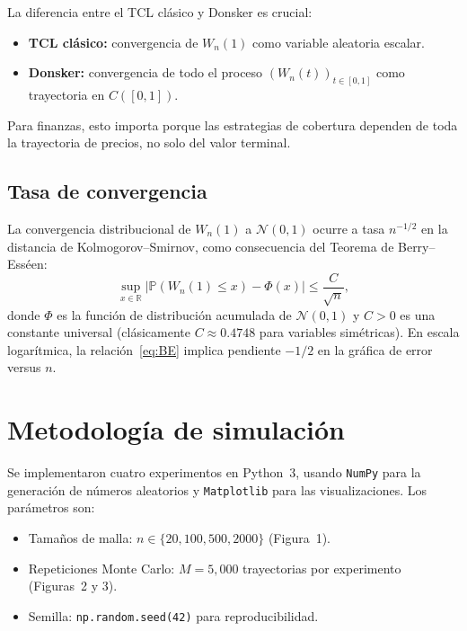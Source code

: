 \documentclass[12pt, a4paper]{article}
\newcommand{\Prob}{\mathbb{P}}
\newcommand{\R}{\mathbb{R}}
\begin{document}
La diferencia entre el TCL clásico y Donsker es crucial:
\begin{itemize}[noitemsep]
  \item \textbf{TCL clásico:} convergencia de $W_n(1)$ como variable aleatoria
        escalar.
  \item \textbf{Donsker:} convergencia de todo el proceso $(W_n(t))_{t \in [0,1]}$
        como trayectoria en $C([0,1])$.
\end{itemize}
Para finanzas, esto importa porque las estrategias de cobertura dependen de
toda la trayectoria de precios, no solo del valor terminal.

\subsection{Tasa de convergencia}

La convergencia distribucional de $W_n(1)$ a $\mathcal{N}(0,1)$ ocurre a
tasa $n^{-1/2}$ en la distancia de Kolmogorov--Smirnov, como consecuencia del
Teorema de Berry--Esséen:
\begin{equation}
  \sup_{x \in \R} \left| \Prob(W_n(1) \le x) - \Phi(x) \right|
  \le \frac{C}{\sqrt{n}},
  \label{eq:BE}
\end{equation}
donde $\Phi$ es la función de distribución acumulada de $\mathcal{N}(0,1)$ y
$C > 0$ es una constante universal (clásicamente $C \approx 0.4748$ para variables
simétricas). En escala logarítmica, la relación~\eqref{eq:BE} implica
pendiente $-1/2$ en la gráfica de error versus $n$.

\section{Metodología de simulación}

Se implementaron cuatro experimentos en Python~3, usando
\texttt{NumPy} para la generación de números aleatorios y \texttt{Matplotlib}
para las visualizaciones. Los parámetros son:
\begin{itemize}[noitemsep]
  \item Tamaños de malla: $n \in \{20, 100, 500, 2000\}$ (Figura~1).
  \item Repeticiones Monte Carlo: $M = 5{,}000$ trayectorias por experimento
        (Figuras~2 y 3).
  \item Semilla: \texttt{np.random.seed(42)} para reproducibilidad.
\end{itemize}
\end{document}
